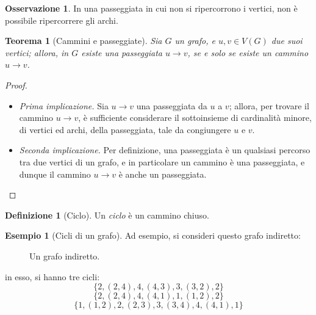 \documentclass[14pt]{extreport}
\newtheorem{theorem}{Teorema}[subsection]
\theoremstyle{definition}
\newtheorem{definition}{Definizione}[subsection]
\theoremstyle{definition}
\newtheorem{remark}{Osservazione}[subsection]
\newtheorem{example}{Esempio}[subsection]
\begin{document}
\begin{remark}
    In una passeggiata in cui non si ripercorrono i vertici, non è possibile ripercorrere gli archi.
\end{remark}

\begin{theorem}[Cammini e passeggiate]
    \label{cammini e passeggiate}
    Sia $G$ un grafo, e $u, v \in V(G)$ due suoi vertici; allora, in $G$ esiste una passeggiata $u \rightarrow v$, se e solo se esiste un cammino $u \rightarrow v$.
\end{theorem}

\begin{proof}
    \hspace{0.7cm}
    \begin{itemize}
        \item[] \textit{Prima implicazione.} Sia $u \rightarrow v$ una passeggiata da $u$ a $v$; allora, per trovare il cammino $u \rightarrow v$, è sufficiente considerare il sottoinsieme di cardinalità minore, di vertici ed archi, della passeggiata, tale da congiungere $u$ e $v$.
        \item[] \textit{Seconda implicazione.} Per definizione, una passeggiata è un qualsiasi percorso tra due vertici di un grafo, e in particolare un cammino è una passeggiata, e dunque il cammino $u \rightarrow v$ è anche un passeggiata.
    \end{itemize}
\end{proof}

\begin{definition}[Ciclo]
    Un \textit{ciclo} è un cammino chiuso.
\end{definition}

\begin{example}[Cicli di un grafo]
    Ad esempio, si consideri questo grafo indiretto:

    \begin{figure}[H]
        \centering
        \caption{Un grafo indiretto.}
    \end{figure}

    in esso, si hanno tre cicli: $$\{2, (2, 4), 4, (4,3), 3, (3, 2), 2\}$$ $$\{2, (2, 4), 4, (4, 1), 1, (1, 2), 2\}$$ $$\{1, (1, 2), 2, (2, 3), 3, (3, 4), 4, (4, 1), 1\}$$
\end{example}
\end{document}
